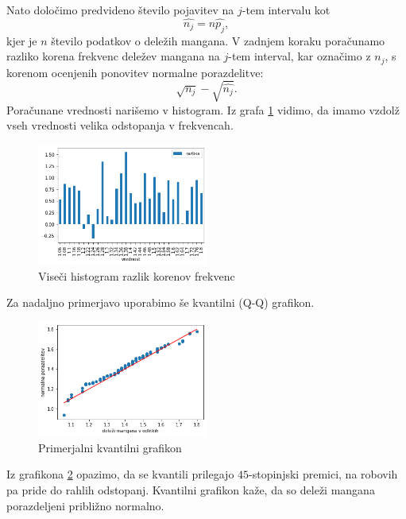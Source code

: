 \documentclass{article}
\begin{document}
Nato določimo predvideno število pojavitev na $j$-tem intervalu kot
\begin{equation}
    \hat{n_j} = n\hat{p_j},
\end{equation}
kjer je $n$ število podatkov o deležih mangana.
V zadnjem koraku poračunamo razliko korena frekvenc deležev mangana na $j$-tem interval,
kar označimo z $n_j$, s korenom
ocenjenih ponovitev normalne porazdelitve:
\begin{equation}
    \sqrt{n_j} - \sqrt{\hat{n_j}}.
\end{equation}
Poračunane vrednosti narišemo v histogram.
Iz grafa \ref{2B} vidimo, da imamo vzdolž vseh vrednosti velika odstopanja v frekvencah.
\begin{figure}[H]
    \begin{center}
        \includegraphics*[width=0.5\textwidth]{figure2B.png}
        \caption{Viseči histogram razlik korenov frekvenc}
        \label{2B}
    \end{center}
\end{figure}



Za nadaljno primerjavo uporabimo še kvantilni (Q-Q) grafikon. 
\begin{figure}[H]
    \begin{center}
        \includegraphics*[width=0.5\textwidth]{figure2C.png}
        \caption{Primerjalni kvantilni grafikon}
        \label{2C}
    \end{center}
\end{figure}

Iz grafikona \ref{2C} opazimo, da se kvantili prilegajo $45$-stopinjski premici, na robovih pa pride do 
rahlih odstopanj. Kvantilni grafikon kaže, da so deleži mangana porazdeljeni približno normalno.
\end{document}
